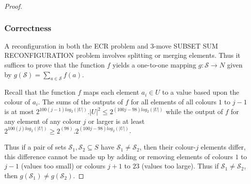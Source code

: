 \begin{proof}
\subsubsection{Correctness}
A reconfiguration in both the ECR problem and $3$-move SUBSET SUM RECONFIGURATION problem involves splitting
or merging elements. Thus it suffices to prove that the function $f$ yields a one-to-one mapping $g : \mathcal{S} \rightarrow N$
given by $g(\mathcal{S}) = \sum_{a \in \mathcal{S}}^{} f(a)$.

Recall that the function $f$ maps each element $a_i \in U$ to a value based upon the colour of $a_i$. The sums of
the outputs of $f$ for all elements of all colours $1$ to $j-1$ is at most $2^{100(j-1) log_{2}(|U|)}.|U|^{2} \leq 2^{(100j-98)log_{2}(|U|)}$
while the output of $f$ for any element of any colour $j$ or larger is at least $2^{100(j) log_{2}(|U|)} \geq 2^{(98)}.2^{(100j-98)log_{2}(|U|)}$.

Thus if a pair of sets $\mathcal{S}_1, \mathcal{S}_2 \subseteq S$ have $\mathcal{S}_1 \neq \mathcal{S}_2$, then their colour-$j$ elements
differ, this difference cannot be made up by adding or removing elements of colours $1$ to $j-1$ (values too small) or colours $j + 1$ to $23$
(values too large). Thus if $\mathcal{S}_1 \neq \mathcal{S}_2$, then $g(\mathcal{S}_1) \neq g(\mathcal{S}_2)$.
\end{proof}


